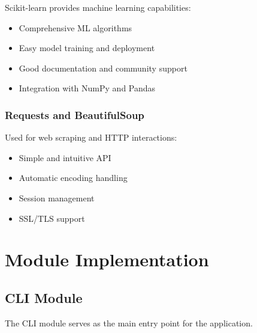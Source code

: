 \documentclass[12pt,a4paper]{report}
\begin{document}
Scikit-learn provides machine learning capabilities:

\begin{itemize}
    \item Comprehensive ML algorithms
    \item Easy model training and deployment
    \item Good documentation and community support
    \item Integration with NumPy and Pandas
\end{itemize}

\subsubsection{Requests and BeautifulSoup}

Used for web scraping and HTTP interactions:

\begin{itemize}
    \item Simple and intuitive API
    \item Automatic encoding handling
    \item Session management
    \item SSL/TLS support
\end{itemize}

\section{Module Implementation}

\subsection{CLI Module}

The CLI module serves as the main entry point for the application.
\end{document}
